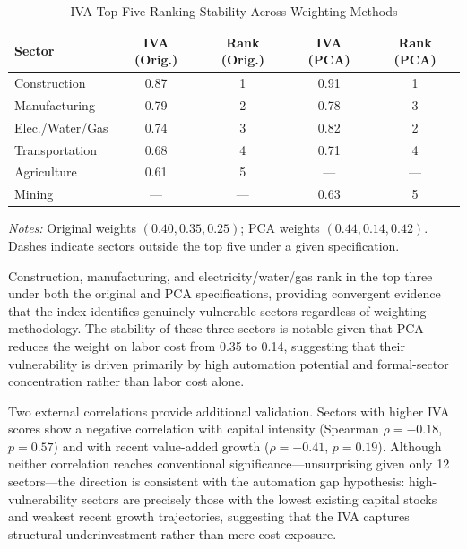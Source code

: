 \documentclass[5p,times,authoryear]{elsarticle}
\begin{document}
\begin{table}[htbp]
\centering
\begin{threeparttable}
\caption{IVA Top-Five Ranking Stability Across Weighting Methods}
\label{tab:iva_validation}
\small
\setlength{\tabcolsep}{5pt}
\begin{tabular}{@{}lcccc@{}}
\toprule
Sector & IVA (Orig.) & Rank (Orig.) & IVA (PCA) & Rank (PCA) \\
\midrule
Construction       & 0.87 & 1 & 0.91 & 1 \\
Manufacturing      & 0.79 & 2 & 0.78 & 3 \\
Elec./Water/Gas    & 0.74 & 3 & 0.82 & 2 \\
Transportation     & 0.68 & 4 & 0.71 & 4 \\
Agriculture        & 0.61 & 5 & ---  & --- \\
Mining             & ---  & --- & 0.63 & 5 \\
\bottomrule
\end{tabular}
\begin{tablenotes}
\footnotesize
\item \textit{Notes:} Original weights $(0.40, 0.35, 0.25)$; PCA weights $(0.44, 0.14, 0.42)$. Dashes indicate sectors outside the top five under a given specification.
\end{tablenotes}
\end{threeparttable}
\end{table}

Construction, manufacturing, and electricity/water/gas rank in the top three under both the original and PCA specifications, providing convergent evidence that the index identifies genuinely vulnerable sectors regardless of weighting methodology. The stability of these three sectors is notable given that PCA reduces the weight on labor cost from 0.35 to 0.14, suggesting that their vulnerability is driven primarily by high automation potential and formal-sector concentration rather than labor cost alone.

Two external correlations provide additional validation. Sectors with higher IVA scores show a negative correlation with capital intensity (Spearman $\rho = -0.18$, $p = 0.57$) and with recent value-added growth ($\rho = -0.41$, $p = 0.19$). Although neither correlation reaches conventional significance---unsurprising given only 12 sectors---the direction is consistent with the automation gap hypothesis: high-vulnerability sectors are precisely those with the lowest existing capital stocks and weakest recent growth trajectories, suggesting that the IVA captures structural underinvestment rather than mere cost exposure.
\end{document}
